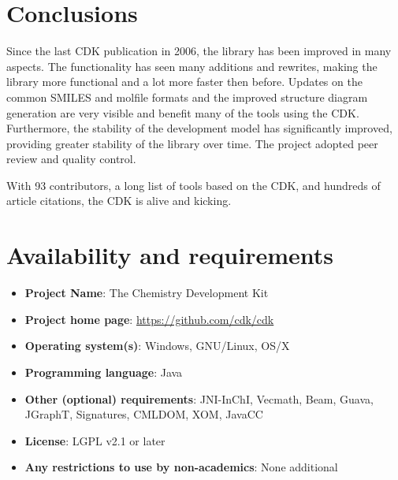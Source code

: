 \documentclass[10pt]{bmcart}
\begin{document}
\section*{Conclusions}

Since the last CDK publication in 2006, the library has been improved in many
aspects. The functionality has seen many additions and rewrites, making the
library more functional and a lot more faster then before. Updates on the common
SMILES and molfile formats and the improved structure diagram generation are
very visible and benefit many of the tools using the CDK.
Furthermore, the stability of the development model has significantly improved,
providing greater stability of the library over time. The project adopted peer
review and quality control.

With 93 contributors, a long list of tools based on the CDK, and hundreds
of article citations, the CDK is alive and kicking.

\section*{Availability and requirements}

\begin{itemize}
\item \textbf{Project Name}: The Chemistry Development Kit
\item \textbf{Project home page}: \url{https://github.com/cdk/cdk}
\item \textbf{Operating system(s)}: Windows, GNU/Linux, OS/X
\item \textbf{Programming language}: Java
\item \textbf{Other (optional) requirements}: JNI-InChI, Vecmath, Beam, Guava, JGraphT, Signatures, CMLDOM, XOM, JavaCC
\item \textbf{License}: LGPL v2.1 or later
\item \textbf{Any restrictions to use by non-academics}: None additional
\end{itemize}

\end{document}
